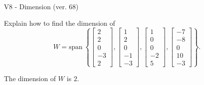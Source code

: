 \begin{exercise}
  \begin{exerciseTitle}V8 - Dimension (ver. 68)\end{exerciseTitle}
  \begin{exerciseStatement}
    Explain how to find the dimension of 
\[W=\mathrm{span}\ \left\{\left[\begin{array}{r}
2 \\
2 \\
0 \\
-3 \\
2
\end{array}\right] , \left[\begin{array}{r}
1 \\
2 \\
0 \\
-1 \\
-3
\end{array}\right] , \left[\begin{array}{r}
1 \\
0 \\
0 \\
-2 \\
5
\end{array}\right] , \left[\begin{array}{r}
-7 \\
-8 \\
0 \\
10 \\
-3
\end{array}\right]\right\}.\]



  \end{exerciseStatement}
  \begin{exerciseAnswer}
   The dimension of \(W\) is  \(2\).
  


  \end{exerciseAnswer}
\end{exercise}